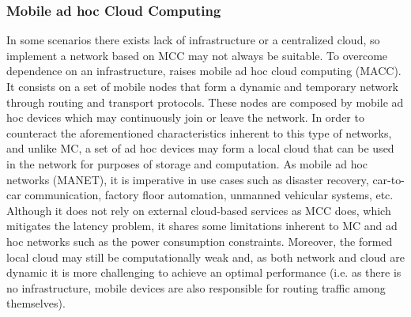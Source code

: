 \subsubsection{Mobile ad hoc Cloud Computing}
In some scenarios there exists lack of infrastructure or a centralized cloud, so implement a network based on MCC may not always be suitable. To overcome dependence on an infrastructure, raises mobile ad hoc cloud computing (MACC). It consists on a set of mobile nodes that form a dynamic and temporary network through routing and transport protocols. These nodes are composed by mobile ad hoc devices which may continuously join or leave the network. In order to counteract the aforementioned characteristics inherent to this type of networks, and unlike MC, a set of ad hoc devices may form a local cloud that can be used in the network for purposes of storage and computation. As mobile ad hoc networks (MANET), it is imperative in use cases such as disaster recovery, car-to-car communication, factory floor automation, unmanned vehicular systems, etc. Although it does not rely on external cloud-based services as MCC does, which mitigates the latency problem, it shares some limitations inherent to MC and ad hoc networks such as the power consumption constraints. Moreover, the formed local cloud may still be computationally weak and, as both network and cloud are dynamic it is more challenging to achieve an optimal performance (i.e. as there is no infrastructure, mobile devices are also responsible for routing traffic among themselves).

